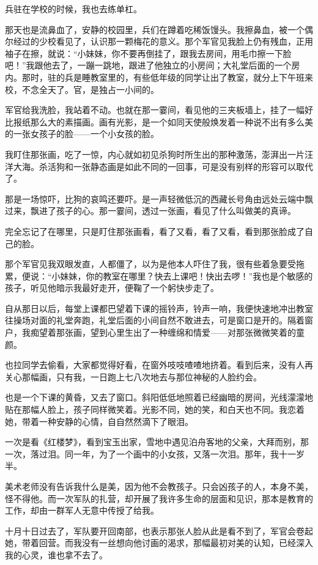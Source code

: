 \par 兵驻在学校的时候，我也去练单杠。
\par 那天也是流鼻血了，安静的校园里，兵们在蹲着吃稀饭馒头。我擦鼻血，被一个偶尔经过的少校看见了，认识那一颗梅花的意义。那个军官见我脸上仍有残血，正用袖子在擦，就说：“小妹妹，你不要再倒挂了，跟我去房间，用毛巾擦一下脸吧！”我跟他去了，一蹦一跳地，跟进了他独立的小房间；大礼堂后面的一个房内。那时，驻的兵是睡教室里的，有些低年级的同学让出了教室，就分上下午班来校，不念全天了。官，是独占一小间的。
\par 军官给我洗脸，我站着不动。也就在那一霎间，看见他的三夹板墙上，挂了一幅好比报纸那么大的素描画。画有光影，是一个如同天使般焕发着一种说不出有多么美的一张女孩子的脸——一个小女孩的脸。
\par 我盯住那张画，吃了一惊，内心就如初见杀狗时所生出的那种激荡，澎湃出一片汪洋大海。杀活狗和一张静态画是如此不同的一回事，可是没有别样的形容可以取代了。
\par 那是一场惊吓，比狗的哀鸣还要吓。是一声轻微低沉的西藏长号角由远处云端中飘过来，飘进了孩子的心。那一霎间，透过一张画，看见了什么叫做美的真谛。
\par 完全忘记了在哪里，只是盯住那张画看，看了又看，看了又看，看到那张脸成了自己的脸。
\par 那个军官见我双眼发直，人都僵了，以为是他本人吓住了我，很有些着急要受拖累，便说：“小妹妹，你的教室在哪里？快去上课吧！快出去啰！”我也是个敏感的孩子，听见他暗示我最好走开，便鞠了一个躬快步走了。
\par 自从那日以后，每堂上课都巴望着下课的摇铃声，铃声一响，我便快速地冲出教室往操场对面的礼堂奔跑，礼堂后面的小间自然不敢进去，可是窗口是开的。隔着窗户，我痴望着那张画，望到心里生出了一种缠绵和情爱——对那张微微笑着的童颜。
\par 也拉同学去偷看，大家都觉得好看，在窗外吱吱喳喳地挤着。看到后来，没有人再关心那幅画，只有我，一日跑上七八次地去与那位神秘的人脸约会。
\par 也是一个下课的黄昏，又去了窗口。斜阳低低地照着已经幽暗的房间，光线濛濛地贴在那幅人脸上，孩子同样微笑着。光影不同，她的笑，和白天也不同。我恋着她，带着一种安静的心情，自自然然滴下了眼泪。
\par 一次是看《红楼梦》，看到宝玉出家，雪地中遇见泊舟客地的父亲，大拜而别，那一次，落过泪。同一年，为了一个画中的小女孩，又落一次泪。那年，我十一岁半。
\par 美术老师没有告诉我什么是美，因为他不会教孩子。只会凶孩子的人，本身不美，怪不得他。而一次军队的扎营，却开展了我许多生命的层面和见识，那本是教育的工作，却由一群军人无意中传授了给我。
\par 十月十日过去了，军队要开回南部，也表示那张人脸从此是看不到了，军官会卷起她，带着回营。而我没有一丝想向他讨画的渴求，那幅最初对美的认知，已经深入我的心灵，谁也拿不去了。
